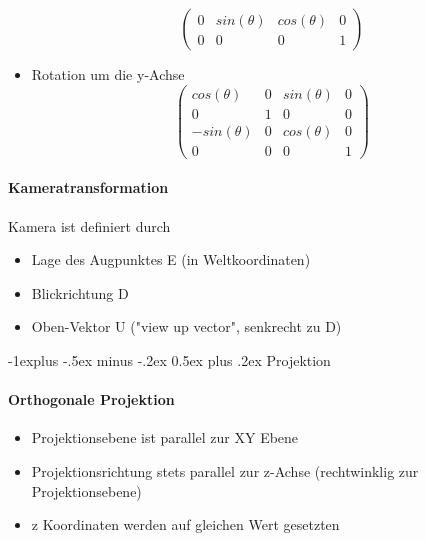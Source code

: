 \documentclass[10pt,landscape]{article}
\makeatletter
\renewcommand{\subsection}{\@startsection{subsection}{2}{0mm}%
                                {-1explus -.5ex minus -.2ex}%
                                {0.5ex plus .2ex}%
                                {\normalfont\normalsize\bfseries}}
\makeatother
\begin{document}
\begin{multicols}{3}
\begin{itemize}
$$\begin{pmatrix}
              0 & sin(\theta) & cos(\theta)  & 0 \\
              0 & 0           & 0            & 1
            \end{pmatrix}$$
    \item Rotation um die y-Achse
          $$\begin{pmatrix}
              cos(\theta)  & 0 & sin(\theta) & 0 \\
              0            & 1 & 0           & 0 \\ 
              -sin(\theta) & 0 & cos(\theta) & 0 \\
              0            & 0 & 0           & 1
            \end{pmatrix}$$
  \end{itemize}
  
  \paragraph{Kameratransformation}
  Kamera ist definiert durch
  \begin{itemize}
    \item Lage des Augpunktes E (in Weltkoordinaten)
    \item Blickrichtung D
    \item Oben-Vektor U ("view up vector", senkrecht zu D)
  \end{itemize}
  
  \subsection{Projektion}
  \paragraph{Orthogonale Projektion}
  \begin{itemize}
    \item Projektionsebene ist parallel zur XY Ebene
    \item Projektionsrichtung stets parallel zur z-Achse (rechtwinklig zur Projektionsebene)
    \item z Koordinaten werden auf gleichen Wert gesetzten
  \end{itemize}
  

\end{multicols}
\end{document}
